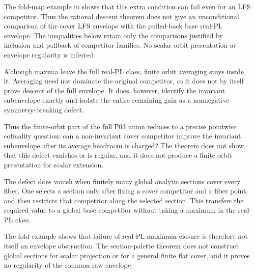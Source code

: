 


The fold-map example in
 shows that this extra
condition can fail even for an LFS competitor. Thus the rational descent
theorem does not give an unconditional comparison of the cover LFS envelope
with the pulled-back base real-PL envelope. The inequalities below retain
only the comparisons justified by inclusion and pullback of competitor
families. No scalar orbit presentation or envelope regularity is inferred.

Although maxima leave the full real-PL class, finite orbit averaging stays
inside it.  Averaging need not dominate the original competitor, so it does
not by itself prove descent of the full envelope.  It does, however, identify
the invariant subenvelope exactly and isolate the entire remaining gain as a
nonnegative symmetry-breaking defect.




Thus the finite-orbit part of the full P03 union reduces to a precise
pointwise cofinality question: can a non-invariant cover competitor improve
the invariant subenvelope after its average headroom is charged?  The theorem
does not show that this defect vanishes or is regular, and it does not produce
a finite orbit presentation for scalar extension.

The defect does vanish when finitely many global analytic sections cover
every fiber.  One selects a section only after fixing a cover competitor and
a fiber point, and then restricts that competitor along the selected section.
This transfers the required value to a global base competitor without taking
a maximum in the real-PL class.




The fold example shows that failure of real-PL maximum closure is therefore
not itself an envelope obstruction.  The section-palette theorem does not
construct global sections for scalar projection or for a general finite flat
cover, and it proves no regularity of the common raw envelope.

